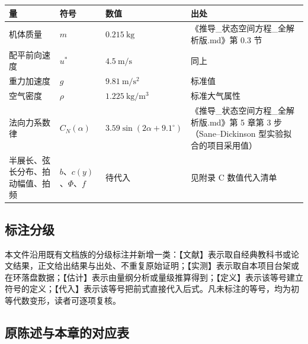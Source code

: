 \documentclass[11pt,a4paper]{ctexart}
\numberwithin{equation}{section}
\begin{document}
\begin{table}[htbp]
  \centering
  \small
  \begin{tabularx}{\textwidth}{@{} l l l X @{}}
    \toprule
    量 & 符号 & 数值 & 出处 \\
    \midrule
    机体质量 & $m$ & $0.215\ \mathrm{kg}$ & 《推导\_状态空间方程\_全解析版.md》第 0.3 节 \\
    配平前向速度 & $u^*$ & $4.5\ \mathrm{m/s}$ & 同上 \\
    重力加速度 & $g$ & $9.81\ \mathrm{m/s^2}$ & 标准值 \\
    空气密度 & $\rho$ & $1.225\ \mathrm{kg/m^3}$ & 标准大气属性 \\
    法向力系数律 & $C_N(\alpha)$ & $3.59\sin(2\alpha + 9.1^\circ)$ & 《推导\_状态空间方程\_全解析版.md》第 5 章第 3 步（Sane--Dickinson 型实验拟合的项目采用值） \\
    半展长、弦长分布、拍动幅值、拍频 & $b$、$c(y)$、$\Phi$、$f$ & 待代入 & 见附录 C 数值代入清单 \\
    \bottomrule
  \end{tabularx}
\end{table}

\subsection{标注分级}

本文件沿用既有文档族的分级标注并新增一类：【文献】表示取自经典教科书或论文结果，正文给出结果与出处、不重复原始证明；【实测】表示取自本项目台架或在环落盘数据；【估计】表示由量纲分析或量级推算得到；【定义】表示该等号建立符号的定义；【代入】表示该等号把前式直接代入后式。凡未标注的等号，均为初等代数变形，读者可逐项复核。

\subsection{原陈述与本章的对应表}
\end{document}
